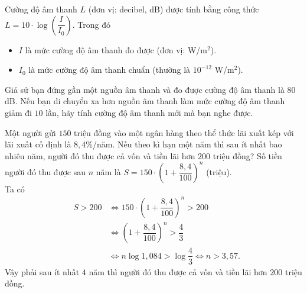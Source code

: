 \begin{ex}%
	Cường độ âm thanh $L$ (đơn vị: decibel, dB) được tính bằng công thức \break $L=10\cdot\log\left(\dfrac{I}{I_0}\right)$.	Trong đó
	\begin{itemize}
		\item $I$ là mức cường độ âm thanh đo được (đơn vị: W/m$^2$).
		\item $I_0$ là mức cường độ âm thanh chuẩn (thường là $10^{-12}$ W/m$^2$).
	\end{itemize}
	Giả sử bạn đứng gần một nguồn âm thanh và đo được cường độ âm thanh là $80$ dB. Nếu bạn di chuyển xa hơn nguồn âm thanh làm mức cường độ âm thanh giảm đi $10$ lần, hãy tính cường độ âm thanh mới mà bạn nghe được.
\end{ex}

\begin{ex}%
	Một người gửi $150$ triệu đồng vào một ngân hàng theo thể thức lãi xuất kép với lãi xuất cố định là $8{,}4\%$/năm. Nếu theo kì hạn một năm thì sau ít nhất bao nhiêu năm, người đó thu được cả vốn và tiền lãi hơn $200$ triệu đồng?
	\loigiai
	{
	Số tiền người đó thu được sau $n$ năm là $S=150\cdot{\left(1+\dfrac{8{,}4}{100}\right)^n}$ (triệu).\\
	Ta có
		\begin{eqnarray*}
			&  S>200 &\Leftrightarrow 150 \cdot{\left(1+\dfrac{8{,}4}{100}\right)^n}>200\\
			& &\Leftrightarrow {\left(1+\dfrac{8{,}4}{100}\right)^n}>\dfrac{4}{3}\\
			& &\Leftrightarrow n\log 1{,}084>\log \dfrac{4}{3}\Leftrightarrow n>3{,}57.
		\end{eqnarray*}
	Vậy phải sau ít nhất $4$ năm thì người đó thu được cả vốn và tiền lãi hơn $200$ triệu đồng.
}
\end{ex}

